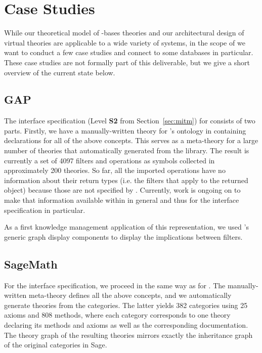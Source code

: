\section{Case Studies}\label{sec:cases}

While our theoretical model of \DKS-bases theories and our architectural design of virtual theories are applicable to a wide variety of systems, in the scope of \pn we want to conduct a few case studies and connect to some databases in particular.
These case studies are not formally part of this deliverable, but we give a short overview of the current state below.

\subsection{GAP}\label{sec:gap}

The interface specification (Level \textbf{S2} from Section~\ref{sec:mitm}) for \GAP consists of two parts.
Firstly, we have a manually-written theory for \GAP's ontology in \MMT containing declarations for all of the above concepts.
This serves as a meta-theory for a large number of theories that automatically generated from the \GAP library.
The result is currently a set of 4097 filters and operations as \MMT symbols collected in approximately 200 theories.
So far, all the imported operations have no information about their return types (i.e. the filters that apply to the returned object) because those are not specified by \GAP.
Currently, work is ongoing on \GAP to make that information available within \GAP in general and thus for the interface specification in particular.

As a first knowledge management application of this representation, we used \MMT's generic graph display components to display the implications between \GAP filters.

\subsection{SageMath}\label{sec:sage}

For the interface specification, we proceed in the same way as for \GAP.
The manually-written meta-theory defines all the above concepts, and we automatically generate theories from the \SageMath categories.
The latter yields 382 categories using 25 axioms and 808 methods, where each category corresponds to one \MMT theory declaring its methods and axioms as well as the corresponding documentation.
The theory graph of the resulting theories mirrors exactly the inheritance graph of the original categories in Sage.


